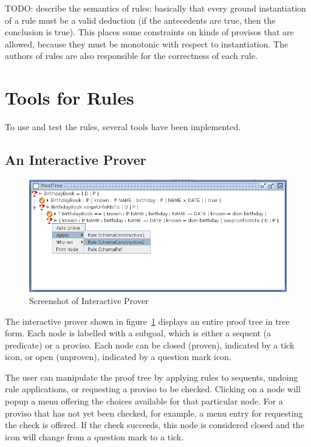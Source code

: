 \documentclass{entcs}
\begin{document}
TODO: describe the semantics of rules: basically that every ground
instantiation of a rule must be a valid deduction (if the antecedents
are true, then the conclusion is true).  This places some constraints
on kinds of provisos that are allowed, because they must be monotonic
with respect to instantiation.  The authors of rules are also
responsible for the correctness of each rule.  


\section{Tools for Rules} \label{sec:tools}

To use and test the rules, several tools have been implemented.

\subsection{An Interactive Prover}

\begin{figure}[htbp]
  \centering
  \includegraphics[width=\textwidth]{cztprover1}
  \caption{Screenshot of Interactive Prover}
  \label{fig:cztprover}
\end{figure}

The interactive prover shown in figure~\ref{fig:cztprover} 
displays an entire proof tree in tree form.  
Each node is labelled with a subgoal, which is either a sequent
(a predicate) or a proviso.  Each node can be closed (proven), indicated
by a tick icon, or open (unproven), indicated by a question mark
icon.

The user can manipulate the proof tree by applying rules to sequents,
undoing rule applications, or requesting a proviso to be checked.
Clicking on a node will popup a menu offering the choices available
for that particular node.  For a proviso that has not yet been
checked, for example, a menu entry for requesting the check is
offered.  If the check succeeds, this node is considered closed and
the icon will change from a question mark to a tick.
\end{document}
